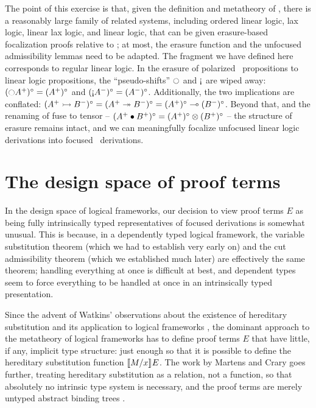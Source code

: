 The point of this exercise is that, given the definition and
metatheory of \ollll, there is a reasonably large family of related
systems, including ordered linear logic, lax logic, linear lax logic, and
linear logic, that can be given erasure-based focalization proofs
relative to \ollll; at most, the erasure function and the unfocused
admissibility lemmas need to be adapted. The fragment we have defined
here corresponds to regular linear logic. In the erasure of polarized
\ollll~propositions to linear logic propositions, the
``pseudo-shifts'' ${\ocircle}$ and ${\gnab}$ are wiped away:
$({\ocircle}A^+)^\circ = (A^+)^\circ$ and $({\gnab}A^-)^\circ =
(A^-)^\circ$.  Additionally, the two implications are conflated: $(A^+
\rightarrowtail B^-)^\circ = (A^+ \twoheadrightarrow B^-)^\circ = (A^+)^\circ \multimap
(B^-)^\circ$. Beyond that, and the renaming of fuse to tensor -- $(A^+
\mathbin{\bullet} B^+)^\circ = (A^+)^\circ \otimes (B^+)^\circ$ -- the structure
of erasure remains intact, and we can 
meaningfully focalize unfocused linear logic derivations into focused 
\ollll~derivations.

\section{The design space of proof terms}
\label{sec:intrinsic-extrinsic}

In the design space of logical frameworks, our decision to view
proof terms $E$ as being fully intrinsically typed representatives
of focused derivations is somewhat unusual. This is because, in 
a dependently typed logical framework, the variable substitution
theorem (which we had to establish very early on) and the cut 
admissibility theorem (which we established much later) are effectively
the same theorem; handling everything at once is difficult at best,
and dependent types seem to force everything to be handled at once in
an intrinsically typed presentation.

Since the advent of Watkins' observations about the existence of
hereditary substitution and its application to logical frameworks
\cite{watkins02concurrent}, the dominant approach to the metatheory of
logical frameworks has to define proof terms $E$ that have little, if
any, implicit type structure: just enough so that
it is possible to define the hereditary substitution function
$\llbracket {M}/{x} \rrbracket^{} {E}$. The work by Martens and Crary goes further,
treating hereditary substitution as a relation, not a function, so
that absolutely no intrinsic type system is necessary, and the proof
terms are merely untyped abstract binding trees
\cite{martens12lf}.

